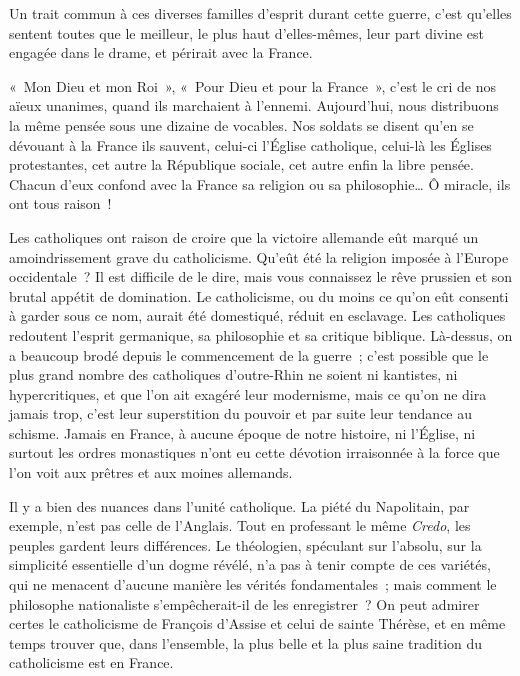 \documentclass[french,twoside]{book} %
\newcommand\chaptercont{} %
\begin{document}
\chaptercont
\noindent Un trait commun à ces diverses familles d’esprit durant cette guerre, c’est qu’elles sentent toutes que le meilleur, le plus haut d’elles-mêmes, leur part divine est engagée dans le drame, et périrait avec la France.‌\par
« Mon Dieu et mon Roi », « Pour Dieu et pour la France », c’est le cri de nos aïeux unanimes, quand ils marchaient à l’ennemi. Aujourd’hui, nous distribuons la même pensée sous une dizaine de vocables. Nos soldats se disent qu’en se dévouant à la France ils sauvent, celui-ci l’Église catholique, celui-là les Églises protestantes, cet autre la République sociale, cet autre enfin la libre pensée. Chacun d’eux confond avec la France sa religion ou sa philosophie… Ô miracle, ils ont tous raison !‌\par
Les catholiques ont raison de croire que la victoire allemande eût marqué un amoindrissement grave du catholicisme. Qu’eût été la religion imposée à l’Europe occidentale ? Il est difficile de le dire, mais vous connaissez le rêve prussien et son brutal appétit de domination. Le catholicisme, ou du moins ce qu’on eût consenti à garder sous ce nom, aurait été domestiqué, réduit en esclavage. Les catholiques redoutent l’esprit germanique, sa philosophie et sa critique biblique. Là-dessus, on a beaucoup brodé depuis le commencement de la guerre ; c’est possible que le plus grand nombre des catholiques d’outre-Rhin ne soient ni kantistes, ni hypercritiques, et que l’on ait exagéré leur modernisme, mais ce qu’on ne dira jamais trop, c’est leur superstition du pouvoir et par suite leur tendance au schisme. Jamais en France, à aucune époque de notre histoire, ni l’Église, ni surtout les ordres monastiques n’ont eu cette dévotion irraisonnée à la force que l’on voit aux prêtres et aux moines allemands.‌\par
Il y a bien des nuances dans l’unité catholique. La piété du Napolitain, par exemple, n’est pas celle de l’Anglais. Tout en professant le même {\itshape Credo}, les peuples gardent leurs différences. Le théologien, spéculant sur l’absolu, sur la simplicité essentielle d’un dogme révélé, n’a pas à tenir compte de ces variétés, qui ne menacent d’aucune manière les vérités fondamentales ; mais comment le philosophe nationaliste s’empêcherait-il de les enregistrer ? On peut admirer certes le catholicisme de François d’Assise et celui de sainte Thérèse, et en même temps trouver que, dans l’ensemble, la plus belle et la plus saine tradition du catholicisme est en France.‌\par
\end{document}
